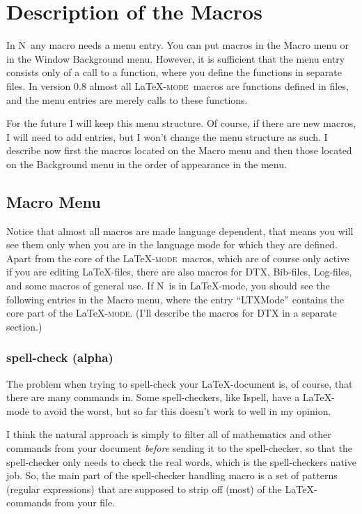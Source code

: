 \documentclass{article}
\newcommand{\latexpack}{\LaTeX-\textsc{mode}}
\newcommand{\nedit}{N\kern-0.8pt{Edit}}
\newcommand{\menu}[1]{``#1''}
\begin{document}
\newpage
\section{Description of the Macros}  
In \nedit\ any macro needs a menu entry. You can put macros in the Macro menu or in the Window Background menu. However, it is sufficient that the menu entry consists only of a call to a function, where you  define the functions in separate files. In version 0.8 almost all \latexpack\ macros are functions defined in files, and the menu entries are merely calls to these functions.

For the future I will keep this menu structure. Of course, if there are new macros, I will need to add entries, but I won't change the menu structure as such.
I describe now first the macros located on the Macro menu and then those located on the Background menu in the order of appearance in the menu.

\subsection{Macro Menu} 
Notice that almost all macros are made language dependent, that means you will see them only when you are in the language mode for which they are defined. Apart from the core of the \latexpack\ macros, which are of course only active if you are editing \LaTeX-files, there are also macros for \textsc{DTX}, Bib-files, Log-files, and some macros of general use. If \nedit\ is in \LaTeX-mode, you should see the following entries in the Macro menu, where the entry \menu{LTXMode} contains the core part of the \latexpack. (I'll describe the macros for \textsc{DTX}  in a separate section.)

\subsubsection{spell-check (alpha)}
The problem when trying to spell-check your \LaTeX-document is, of course, that there are many commands in. Some spell-checkers, like Ispell, have a \LaTeX-mode to avoid the worst, but so far this doesn't work to well in my opinion.

I think the natural approach is simply to filter all of mathematics and other commands from your document \emph{before} sending it to the spell-checker, so that the spell-checker only needs to check the real words, which is the spell-checkers native job. So, the main part of the spell-checker handling macro is a set of patterns (regular expressions) that are supposed to strip off (most) of the \LaTeX-commands from your file.
\end{document}
